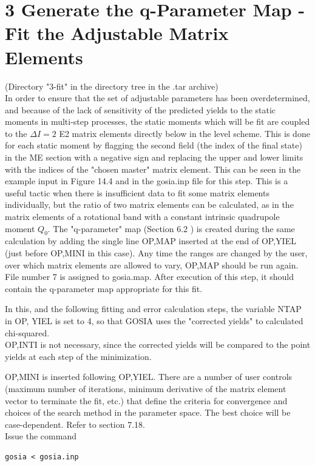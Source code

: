 \documentclass[10pt]{article}
\begin{document}
\section*{3 Generate the q-Parameter Map - Fit the Adjustable Matrix Elements}
(Directory "3-fit" in the directory tree in the .tar archive)\\
In order to ensure that the set of adjustable parameters has been overdetermined, and because of the lack of sensitivity of the predicted yields to the static moments in multi-step processes, the static moments which will be fit are coupled to the $\Delta I=2$ E2 matrix elements directly below in the level scheme. This is done for each static moment by flagging the second field (the index of the final state) in the ME section with a negative sign and replacing the upper and lower limits with the indices of the "chosen master" matrix element. This can be seen in the example input in Figure 14.4 and in the gosia.inp file for this step. This is a useful tactic when there is insufficient data to fit some matrix elements individually, but the ratio of two matrix elements can be calculated, as in the matrix elements of a rotational band with a constant intrinsic quadrupole moment $Q_{0}$. The "q-parameter" map (Section 6.2 ) is created during the same calculation by adding the single line OP,MAP inserted at the end of OP,YIEL (just before OP,MINI in this case). Any time the ranges are changed by the user, over which matrix elements are allowed to vary, OP,MAP should be run again.\\
File number 7 is assigned to gosia.map. After execution of this step, it should contain the q-parameter map appropriate for this fit.

In this, and the following fitting and error calculation steps, the variable NTAP in OP, YIEL is set to 4, so that GOSIA uses the "corrected yields" to calculated chi-squared.\\
OP,INTI is not necessary, since the corrected yields will be compared to the point yields at each step of the minimization.

OP,MINI is inserted following OP,YIEL. There are a number of user controls (maximum number of iterations, minimum derivative of the matrix element vector to terminate the fit, etc.) that define the criteria for convergence and choices of the search method in the parameter space. The best choice will be case-dependent. Refer to section 7.18.\\
Issue the command

\begin{verbatim}
gosia < gosia.inp
\end{verbatim}
\end{document}
